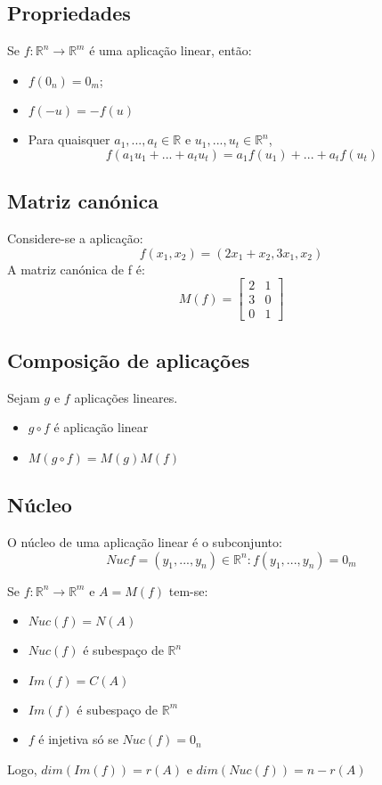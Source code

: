 \documentclass[10pt,a4paper]{report}
\begin{document}
\subsection{Propriedades}
Se $f: \mathbb{R}^n \rightarrow \mathbb{R}^m$ é uma aplicação linear, então:
\begin{itemize}
\item $f(0_n) = 0_m$;
\item $f(-u) = -f(u)$
\item Para quaisquer $a_1, ..., a_t \in \mathbb{R}$ e $u_1, ..., u_t \in \mathbb{R}^n$,$$
f(a_1u_1 + ... + a_tu_t) = a_1f(u_1) + ... + a_tf(u_t)$$
\end{itemize}

\subsection{Matriz canónica}
Considere-se a aplicação:
$$
f(x_1, x_2) = (2x_1+x_2, 3x_1, x_2)
$$
A matriz canónica de f é:
$$
M(f) =  \begin{bmatrix} 2 & 1 \\ 3 & 0 \\ 0 & 1 \end{bmatrix} 
$$

\subsection{Composição de aplicações}
Sejam $g$ e $f$ aplicações lineares.
\begin{itemize}
\item $g \circ f$ é aplicação linear
\item $M( g \circ f) = M(g)M(f)$
\end{itemize}

\subsection{Núcleo}
O núcleo de uma aplicação linear é o subconjunto:
$$
Nuc f = (y_1, ..., y_n) \in \mathbb{R}^n : f(y_1, ..., y_n) = 0_m
$$

Se $f: \mathbb{R}^n \rightarrow \mathbb{R}^m$ e $A = M(f)$ tem-se:
\begin{itemize}
\item $Nuc (f) = N(A)$
\item $Nuc (f)$ é subespaço de $\mathbb{R}^n$
\item $Im (f) = C(A)$
\item $Im (f)$ é subespaço de $\mathbb{R}^m$
\item $f$ é injetiva só se $Nuc (f) = 0_n$
\end{itemize}
Logo, $dim (Im (f)) = r(A)$ e $dim (Nuc (f)) = n - r(A)$
\end{document}
